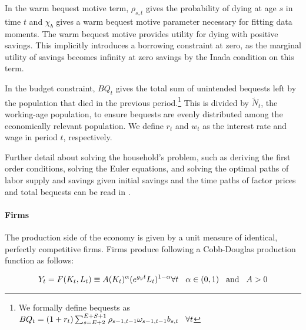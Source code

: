 \documentclass[10pt]{article}
\numberwithin{equation}{subsection}
\begin{document}
\begin{appendices}
\par In the warm bequest motive term, \(\rho_{s,t}\) gives the probability of dying at age \(s\) in time \(t\) and \(\chi_b\) gives a warm bequest motive parameter necessary for fitting data moments. The warm bequest motive provides utility for dying with positive savings. This implicitly introduces a borrowing constraint at zero, as the marginal utility of savings becomes infinity at zero savings by the Inada condition on this term.

\par In the budget constraint, \(BQ_t\) gives the total sum of unintended bequests left by the population that died in the previous period.\footnote{We formally define bequests as \(BQ_t = (1+r_t)\sum_{s=E+2}^{E+S+1}\rho_{s-1,t-1}\omega_{s-1,t-1}b_{s,t} \hspace{3mm} \forall t\)} This is divided by \(\tilde{N}_t\), the working-age population, to ensure bequests are evenly distributed among the economically relevant population. We define \(r_t\) and \(w_t\) as the interest rate and wage in period \(t\), respectively.

\par Further detail about solving the household's problem, such as deriving the first order conditions, solving the Euler equations, and solving the optimal paths of labor supply and savings given initial savings and the time paths of factor prices and total bequests can be read in \cite{E2020}.


\paragraph{Firms}

\par The production side of the economy is given by a unit measure of identical, perfectly competitive firms. Firms produce following a Cobb-Douglas production function as follows:

\begin{equation}
   Y_t = F(K_t, L_t) \equiv A(K_t)^\alpha(e^{g_yt}L_t)^{1-\alpha} \forall t \hspace{3mm} \alpha \in (0, 1) \hspace{3mm} \text{and} \hspace{3mm} A>0
\end{equation}


\end{appendices}
\end{document}
